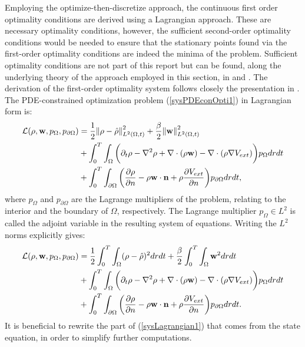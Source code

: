 Employing the  optimize-then-discretize approach, the continuous first order optimality conditions are derived using a Lagrangian approach. These are necessary optimality conditions, however, the sufficient second-order optimality conditions would be needed to ensure that the stationary points found via the first-order optimality conditions are indeed the minima of the problem. Sufficient optimality conditions are not part of this report but can be found, along the underlying theory of the approach employed in this section, in \cite{DeLosReyesOptimization} and \cite{TroeltzschFredi2010OCoP}. The derivation of the first-order optimality system follows closely the presentation in \cite{TroeltzschFredi2010OCoP}.  
The PDE-constrained optimization problem (\ref{sysPDEconOpti1}) in Lagrangian form is:
\begin{align*}
\mathcal{L}(\rho,\mathbf{w}, p_\Omega, p_{\partial \Omega}) &= \frac{1}{2} \norm{\rho- \hat{\rho}}_{L^2(\Omega,t)}^2+ \frac{\beta}{2} \norm{\mathbf{w}}_{L^2(\Omega,t)}^2 \\
&+  \int_0^T \int_\Omega\bigg( \partial_t \rho - \nabla^2 \rho + \nabla \cdot (\rho \mathbf{w}) - \nabla \cdot (\rho \nabla V_{ext}) \bigg) p_\Omega dr dt  \\ 
&+ \int_0^T \int_{\partial \Omega}  \bigg(\dfrac{\partial \rho}{\partial {n}} - \rho \mathbf{w} \cdot \mathbf{n} + \rho \dfrac{\partial V_{ext}}{\partial {n}}\bigg) p_{\partial \Omega} dr dt , 
\end{align*}
where $p_\Omega$ and $p_{\partial \Omega}$ are the Lagrange multipliers of the problem, relating to the interior and the boundary of $\Omega$, respectively. The Lagrange multiplier $p_\Omega \in L^2$ is called the adjoint variable in the resulting system of equations.
Writing the $L^2$ norms explicitly gives:
\begin{align} \label{sysLagrangian1}
\mathcal{L}(\rho,\mathbf{w}, p_\Omega, p_{\partial \Omega}) &= \frac{1}{2}\int_0^T\int_\Omega  (\rho- \hat{\rho})^2 dr dt  + \frac{\beta}{2} \int_0^T \int_\Omega \mathbf{w}^2 dr dt  \\
&+ \int_0^T \int_\Omega \bigg( \partial_t \rho - \nabla^2 \rho + \nabla \cdot (\rho \mathbf{w}) - \nabla \cdot (\rho \nabla V_{ext}) \bigg) p_\Omega dr dt \notag \\ 
&+\int_0^T  \int_{\partial \Omega}  \bigg(\dfrac{\partial \rho}{\partial {n}} - \rho \mathbf{w} \cdot \mathbf{n} + \rho \dfrac{\partial V_{ext}}{\partial {n}}\bigg) p_{\partial \Omega} dr dt  \notag.
\end{align}
It is beneficial to rewrite the part of (\ref{sysLagrangian1}) that comes from the state equation, in order to simplify further computations.
